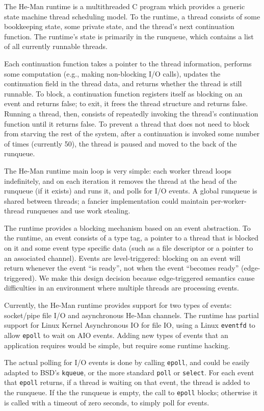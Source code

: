 \documentclass[preprint]{sigplanconf}
\renewcommand{\t}{\texttt}
\begin{document}
The He-Man runtime is a multithreaded C program which provides a generic state
machine thread scheduling model. To the runtime, a thread consists of some
bookkeeping state, some private state, and the thread's next continuation
function. The runtime's state is primarily in the runqueue, which contains a
list of all currently runnable threads.

Each continuation function takes a pointer to the thread information,
performs some computation (e.g., making non-blocking I/O calls),
updates the continuation field in the thread data, and returns whether
the thread is still runnable. To block, a continuation function
registers itself as blocking on an event and returns false; to exit,
it frees the thread structure and returns false. Running a thread,
then, consists of repeatedly invoking the thread's continuation
function until it returns false. To prevent a thread that does not
need to block from starving the rest of the system, after a continuation is
invoked some number of times (currently 50), the thread is paused and moved to
the back of the runqueue.

The He-Man runtime main loop is very simple: each worker thread
loops indefinitely, and on each iteration it removes the thread at the
head of the runqueue (if it exists) and runs it, and polls for I/O
events. A global runqueue is shared between threads; a fancier 
implementation could maintain per-worker-thread runqueues and use
work stealing.

The runtime provides a blocking mechanism based on an event
abstraction. To the runtime, an event consists of a type tag, a
pointer to a thread that is blocked on it and some event type specific
data (such as a file descriptor or a pointer to an associated
channel). Events are level-triggered: blocking on an event will return
whenever the event ``is ready'', not when the event ``becomes ready''
(edge-triggered). We make this design decision because edge-triggered semantics
cause difficulties in an environment where multiple threads are processing
events.

Currently, the He-Man runtime provides support for two types of
events: socket/pipe file I/O and asynchronous He-Man channels.  The
runtime has partial support for Linux Kernel Asynchronous IO for file
IO, using a Linux \t{eventfd} to allow \t{epoll} to wait on AIO
events. Adding new types of events that an application requires would
be simple, but require some runtime hacking.

The actual polling for I/O events is done by calling \t{epoll}, and could be
easily adapted to BSD's \t{kqueue}, or the more standard \t{poll} or \t{select}.
For each event that \t{epoll} returns, if a thread is waiting on that event, the
thread is added to the runqueue. If the the runqueue is empty, the call to
\t{epoll} blocks; otherwise it is called with a timeout of zero seconds, to
simply poll for events.
\end{document}
